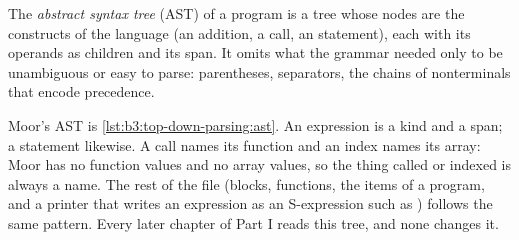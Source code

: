 \begin{definition}\label{def:b3:top-down-parsing:ast}
The \emph{abstract syntax tree} (AST) of a program is a tree whose nodes are the constructs of the language (an addition, a call, an  statement), each with its operands as children and its span. It omits what the grammar needed only to be unambiguous or easy to parse: parentheses, separators, the chains of nonterminals that encode precedence.
\end{definition}

\begin{omfigure}
\par{}
\end{omfigure}

Moor's AST is \cref{lst:b3:top-down-parsing:ast}. An expression is a kind and a span; a statement likewise. A call names its function and an index names its array: Moor has no function values and no array values, so the thing called or indexed is always a name. The rest of the file (blocks, functions, the items of a program, and a printer that writes an expression as an S-expression such as ) follows the same pattern. Every later chapter of Part I reads this tree, and none changes it.

